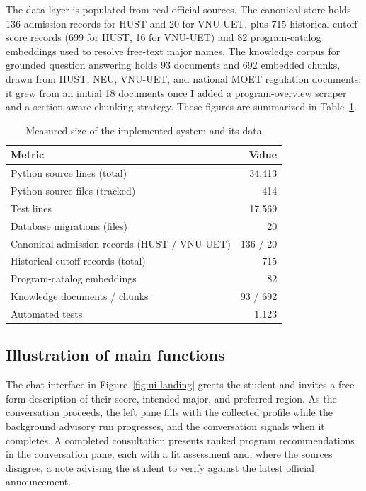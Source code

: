 \documentclass[../main.tex]{subfiles}
\begin{document}
The data layer is populated from real official sources.
The canonical store holds 136 admission records for HUST and 20 for VNU-UET, plus 715 historical cutoff-score records (699 for HUST, 16 for VNU-UET) and 82 program-catalog embeddings used to resolve free-text major names.
The knowledge corpus for grounded question answering holds 93 documents and 692 embedded chunks, drawn from HUST, NEU, VNU-UET, and national \gls{MOET} regulation documents; it grew from an initial 18 documents once I added a program-overview scraper and a section-aware chunking strategy.
These figures are summarized in Table~\ref{table:achievement}.

\begin{table}[H]
    \centering
    \caption{Measured size of the implemented system and its data}
    \label{table:achievement}
    \begin{tabular}{|p{7.5cm}|r|}
        \hline
        \textbf{Metric} & \textbf{Value} \\
        \hline
        Python source lines (total) & 34{,}413 \\
        \hline
        Python source files (tracked) & 414 \\
        \hline
        Test lines & 17{,}569 \\
        \hline
        Database migrations (files) & 20 \\
        \hline
        Canonical admission records (HUST / VNU-UET) & 136 / 20 \\
        \hline
        Historical cutoff records (total) & 715 \\
        \hline
        Program-catalog embeddings & 82 \\
        \hline
        Knowledge documents / chunks & 93 / 692 \\
        \hline
        Automated tests & 1{,}123 \\
        \hline
    \end{tabular}
\end{table}

\subsection{Illustration of main functions}

The chat interface in Figure~\ref{fig:ui-landing} greets the student and invites a free-form description of their score, intended major, and preferred region.
As the conversation proceeds, the left pane fills with the collected profile while the background advisory run progresses, and the conversation signals when it completes.
A completed consultation presents ranked program recommendations in the conversation pane, each with a fit assessment and, where the sources disagree, a note advising the student to verify against the latest official announcement.
\end{document}
